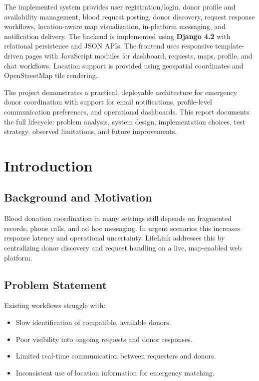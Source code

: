 \documentclass[12pt,a4paper]{report}
\begin{document}
The implemented system provides user registration/login, donor profile and availability management, blood request posting, donor discovery, request response workflows, location-aware map visualization, in-platform messaging, and notification delivery. The backend is implemented using \textbf{Django 4.2} with relational persistence and JSON APIs. The frontend uses responsive template-driven pages with JavaScript modules for dashboard, requests, maps, profile, and chat workflows. Location support is provided using geospatial coordinates and OpenStreetMap tile rendering.

The project demonstrates a practical, deployable architecture for emergency donor coordination with support for email notifications, profile-level communication preferences, and operational dashboards. This report documents the full lifecycle: problem analysis, system design, implementation choices, test strategy, observed limitations, and future improvements.

\tableofcontents
\clearpage

\chapter{Introduction}
\section{Background and Motivation}
Blood donation coordination in many settings still depends on fragmented records, phone calls, and ad hoc messaging. In urgent scenarios this increases response latency and operational uncertainty. LifeLink addresses this by centralizing donor discovery and request handling on a live, map-enabled web platform.

\section{Problem Statement}
Existing workflows struggle with:
\begin{itemize}[leftmargin=1.5em]
\item Slow identification of compatible, available donors.
\item Poor visibility into ongoing requests and donor responses.
\item Limited real-time communication between requesters and donors.
\item Inconsistent use of location information for emergency matching.
\end{itemize}
\end{document}
